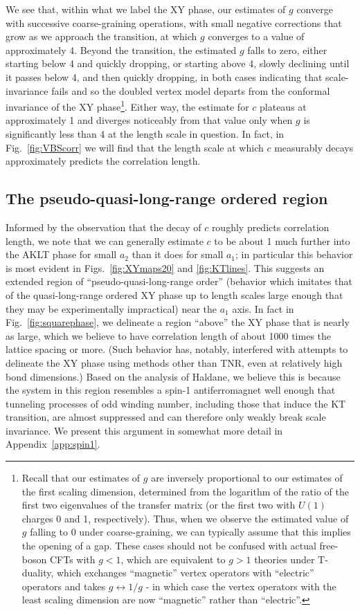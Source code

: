 \documentclass[aps,prb,letterpaper,superscriptaddress,twocolumn,showpacs,floatfix,10pt]{revtex4-1}
\begin{document}
We see that, within what we label the XY phase, our estimates of $g$
converge with successive coarse-graining operations, with small negative
corrections that grow as we approach the transition,
at which $g$ converges to a value
of approximately 4. Beyond the transition, the estimated $g$ falls to zero,
either starting below 4 and quickly dropping, or starting above 4, slowly
declining until it passes below 4, and then quickly dropping,
in both cases indicating that scale-invariance fails and so the doubled
vertex model departs from the conformal invariance of the XY
phase\footnote{Recall that
our estimates of $g$ are inversely proportional to our estimates of the first
scaling dimension, determined from the logarithm of the ratio of
the first two  eigenvalues of the transfer matrix
(or the first two with $U(1)$ charges 0 and 1, respectively).
Thus, when we observe the estimated value of $g$ falling to 0 under
coarse-graining, we can typically assume that this implies the opening of a gap.
These cases should not be confused
with actual free-boson CFTs with $g < 1$, which are equivalent to
$g > 1$ theories under T-duality, which exchanges ``magnetic'' vertex operators
with ``electric'' operators and takes $g \leftrightarrow 1/g$ -
in which case the vertex operators with the least scaling dimension are now
``magnetic'' rather than ``electric''.}. Either way, the estimate
for $c$ plateaus at approximately 1 and diverges noticeably from that value
only when $g$ is significantly less than 4 at the length scale in question.
In fact, in Fig.~\ref{fig:VBScorr} we will find that the length scale at which
$c$ measurably decays approximately predicts the correlation length.

\subsection{The pseudo-quasi-long-range ordered region}
\label{sec:pqlro}

Informed by the observation that the decay of $c$ roughly predicts
correlation length, we note that we can generally estimate $c$ to be
about 1 much further into the AKLT phase for small $a_2$
than it does for small $a_1$; in particular this behavior is most evident in
Figs.~\ref{fig:XYmaps20} and \ref{fig:KTlines}.
This suggests an extended region of
``pseudo-quasi-long-range order'' (behavior which imitates that of the
quasi-long-range ordered XY phase up to length scales large enough that they
may be experimentally impractical)
near the $a_1$ axis. In fact in Fig.~\ref{fig:squarephase}, we delineate
a region ``above'' the XY phase that is nearly as large, which we believe to
have correlation length of about 1000 times the lattice spacing or more.
(Such behavior has, notably, interfered with attempts to delineate the XY phase
using methods other than TNR, even at relatively high bond dimensions.)
Based on the
analysis of Haldane\cite{Haldane2D}, we believe this is because the system in
this region resembles a spin-1 antiferromagnet well enough that tunneling
processes of odd
winding number, including those that induce the KT transition, are almost
suppressed and can therefore only weakly break scale invariance. We
present this argument in somewhat more detail in Appendix~\ref{app:spin1}.
\end{document}
